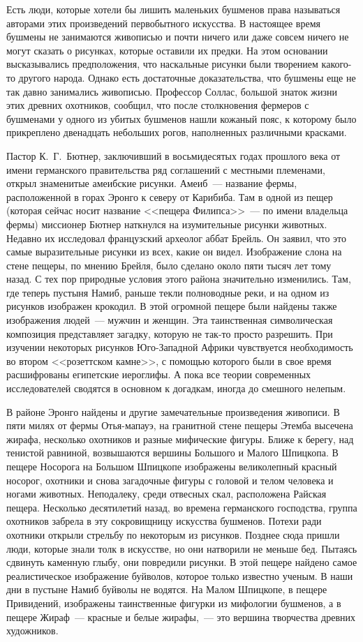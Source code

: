 \documentclass[12pt,a4paper,twoside,openany,svgnames]{memoir}
\begin{document}
Есть люди, которые хотели бы лишить маленьких бушменов права называться авторами этих произведений первобытного искусства. В настоящее время бушмены не занимаются живописью и почти ничего или даже совсем ничего не могут сказать о рисунках, которые оставили их предки. На этом основании высказывались предположения, что наскальные рисунки были творением какого-то другого народа. Однако есть достаточные доказательства, что бушмены еще не так давно занимались живописью. Профессор Соллас, большой знаток жизни этих древних охотников, сообщил, что после столкновения фермеров с бушменами у одного из убитых бушменов нашли кожаный пояс, к которому было прикреплено двенадцать небольших рогов, наполненных различными красками.

Пастор К.~Г.~Бютнер, заключивший в восьмидесятых годах прошлого века от имени германского правительства ряд соглашений с местными племенами, открыл знаменитые амеибские рисунки. Амеиб~--- название фермы, расположенной в горах Эронго к северу от Карибиба. Там в одной из пещер (которая сейчас носит название <<пещера Филипса>>~--- по имени владельца фермы) миссионер Бютнер наткнулся на изумительные рисунки животных. Недавно их исследовал французский археолог аббат Брейль. Он заявил, что это самые выразительные рисунки из всех, какие он видел. Изображение слона на стене пещеры, по мнению Брейля, было сделано около пяти тысяч лет тому назад. С тех пор природные условия этого района значительно изменились. Там, где теперь пустыня Намиб, раньше текли полноводные реки, и на одном из рисунков изображен крокодил. В этой огромной пещере были найдены также изображения людей~--- мужчин и женщин. Эта таинственная символическая композиция представляет загадку, которую не так-то просто разрешить. При изучении некоторых рисунков Юго-Западной Африки чувствуется необходимость во втором <<розеттском камне>>, с помощью которого были в свое время расшифрованы египетские иероглифы. А пока все теории современных исследователей сводятся в основном к догадкам, иногда до смешного нелепым.

В районе Эронго найдены и другие замечательные произведения живописи. В пяти милях от фермы Отья-мапауэ, на гранитной стене пещеры Этемба высечена жирафа, несколько охотников и разные мифические фигуры. Ближе к берегу, над тенистой равниной, возвышаются вершины Большого и Малого Шпицкопа. В пещере Носорога на Большом Шпицкопе изображены великолепный красный носорог, охотники и снова загадочные фигуры с головой и телом человека и ногами животных. Неподалеку, среди отвесных скал, расположена Райская пещера. Несколько десятилетий назад, во времена германского господства, группа охотников забрела в эту сокровищницу искусства бушменов. Потехи ради охотники открыли стрельбу по некоторым из рисунков. Позднее сюда пришли люди, которые знали толк в искусстве, но они натворили не меньше бед. Пытаясь сдвинуть каменную глыбу, они повредили рисунки. В этой пещере найдено самое реалистическое изображение буйволов, которое только известно ученым. В наши дни в пустыне Намиб буйволы не водятся. На Малом Шпицкопе, в пещере Привидений, изображены таинственные фигурки из мифологии бушменов, а в пещере Жираф~--- красные и белые жирафы,~--- это вершина творчества древних художников.
\end{document}
